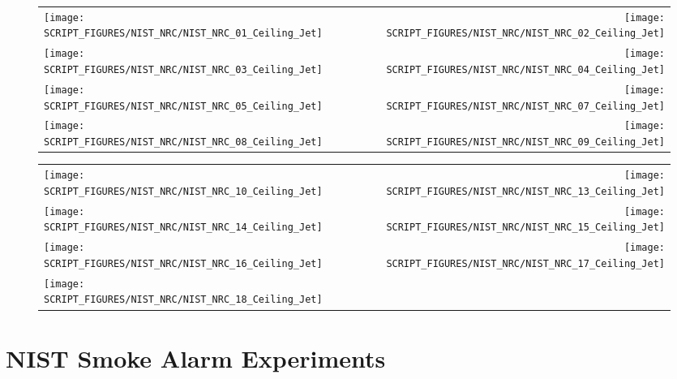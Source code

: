 \begin{figure}[!ht]
\begin{tabular*}{\textwidth}{l@{\extracolsep{\fill}}r}
\texttt{[image: SCRIPT\_FIGURES/NIST\_NRC/NIST\_NRC\_01\_Ceiling\_Jet]} &
\texttt{[image: SCRIPT\_FIGURES/NIST\_NRC/NIST\_NRC\_02\_Ceiling\_Jet]} \\
\texttt{[image: SCRIPT\_FIGURES/NIST\_NRC/NIST\_NRC\_03\_Ceiling\_Jet]} &
\texttt{[image: SCRIPT\_FIGURES/NIST\_NRC/NIST\_NRC\_04\_Ceiling\_Jet]} \\
\texttt{[image: SCRIPT\_FIGURES/NIST\_NRC/NIST\_NRC\_05\_Ceiling\_Jet]} &
\texttt{[image: SCRIPT\_FIGURES/NIST\_NRC/NIST\_NRC\_07\_Ceiling\_Jet]} \\
\texttt{[image: SCRIPT\_FIGURES/NIST\_NRC/NIST\_NRC\_08\_Ceiling\_Jet]} &
\texttt{[image: SCRIPT\_FIGURES/NIST\_NRC/NIST\_NRC\_09\_Ceiling\_Jet]}
\end{tabular*}
\end{figure}

\begin{figure}[!ht]
\begin{tabular*}{\textwidth}{l@{\extracolsep{\fill}}r}
\texttt{[image: SCRIPT\_FIGURES/NIST\_NRC/NIST\_NRC\_10\_Ceiling\_Jet]} &
\texttt{[image: SCRIPT\_FIGURES/NIST\_NRC/NIST\_NRC\_13\_Ceiling\_Jet]} \\
\texttt{[image: SCRIPT\_FIGURES/NIST\_NRC/NIST\_NRC\_14\_Ceiling\_Jet]} &
\texttt{[image: SCRIPT\_FIGURES/NIST\_NRC/NIST\_NRC\_15\_Ceiling\_Jet]} \\
\texttt{[image: SCRIPT\_FIGURES/NIST\_NRC/NIST\_NRC\_16\_Ceiling\_Jet]} &
\texttt{[image: SCRIPT\_FIGURES/NIST\_NRC/NIST\_NRC\_17\_Ceiling\_Jet]} \\
\texttt{[image: SCRIPT\_FIGURES/NIST\_NRC/NIST\_NRC\_18\_Ceiling\_Jet]}
\end{tabular*}
\end{figure}

\clearpage

\section{NIST Smoke Alarm Experiments}

